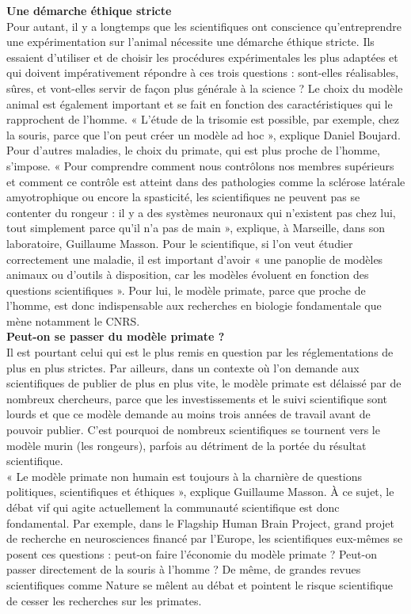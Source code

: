 \documentclass[8pt]{article}
\begin{document}
\textbf{Une démarche éthique stricte}\\

Pour autant, il y a longtemps que les scientifiques ont conscience qu’entreprendre une expérimentation sur l’animal nécessite une démarche éthique stricte. Ils essaient d’utiliser et de choisir les procédures expérimentales les plus adaptées et qui doivent impérativement répondre à ces trois questions : sont-elles réalisables, sûres, et vont-elles servir de façon plus générale à la science ? Le choix du modèle animal est également important et se fait en fonction des caractéristiques qui le rapprochent de l’homme. « L’étude de la trisomie est possible, par exemple, chez la souris, parce que l’on peut créer un modèle ad hoc », explique Daniel Boujard.\\

Pour d’autres maladies, le choix du primate, qui est plus proche de l’homme, s’impose. « Pour comprendre comment nous contrôlons nos membres supérieurs et comment ce contrôle est atteint dans des pathologies comme la sclérose latérale amyotrophique ou encore la spasticité, les scientifiques ne peuvent pas se contenter du rongeur : il y a des systèmes neuronaux qui n’existent pas chez lui, tout simplement parce qu’il n’a pas de main », explique, à Marseille, dans son laboratoire, Guillaume Masson. Pour le scientifique, si l’on veut étudier correctement une maladie, il est important d’avoir « une panoplie de modèles animaux ou d’outils à disposition, car les modèles évoluent en fonction des questions scientifiques ». Pour lui, le modèle primate, parce que proche de l’homme, est donc indispensable aux recherches en biologie fondamentale que mène notamment le CNRS.\\

\textbf{Peut-on se passer du modèle primate ?}\\

Il est pourtant celui qui est le plus remis en question par les réglementations de plus en plus strictes. Par ailleurs, dans un contexte où l’on demande aux scientifiques de publier de plus en plus vite, le modèle primate est délaissé par de nombreux chercheurs, parce que les investissements et le suivi scientifique sont lourds et que ce modèle demande au moins trois années de travail avant de pouvoir publier. C’est pourquoi de nombreux scientifiques se tournent vers le modèle murin (les rongeurs), parfois au détriment de la portée du résultat scientifique.\\

« Le modèle primate non humain est toujours à la charnière de questions politiques, scientifiques et éthiques », explique Guillaume Masson. À ce sujet, le débat vif qui agite actuellement la communauté scientifique est donc fondamental. Par exemple, dans le Flagship Human Brain Project, grand projet de recherche en neurosciences financé par l’Europe, les scientifiques eux-mêmes se posent ces questions : peut-on faire l’économie du modèle primate ? Peut-on passer directement de la souris à l’homme ? De même, de grandes revues scientifiques comme Nature se mêlent au débat et pointent le risque scientifique de cesser les recherches sur les primates.\\
\end{document}
